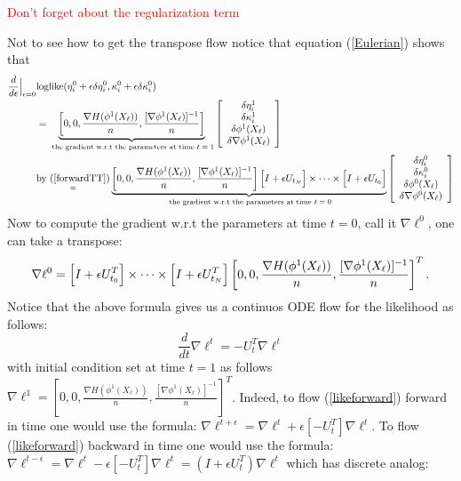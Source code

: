 \documentclass[noinfoline]{imsart}
\begin{document}
{\textcolor{red}{Don't forget about the regularization term}

Not to see how to get the transpose flow notice that equation (\ref{Eulerian}) shows that
\begin{align*}
\frac{d}{d\epsilon}\Bigr|_{\epsilon = 0}& \text{loglike}(\eta_i^0+\epsilon \delta \eta_i^0, \kappa^0_i+\epsilon \delta \kappa_i^0) \\
&=\underbrace{ \left[ 0,0,\frac{\nabla H (\phi^1(X_\ell))}{n}, \frac{[\nabla\phi^1(X_\ell)]^{-1}}{n}  \right]}_{\text{ the gradient w.r.t the parameters at time $t=1$}} \left[\begin{array}{c} \delta\eta^1_i\\ \delta \kappa^1_i \\ \delta\phi^1(X_\ell) \\ \delta \nabla\phi^1(X_\ell)   \end{array}\right] \\
&\underset{=}{ \text{by (\ref{forwardTT})}} \underbrace{ \left[ 0,0,\frac{\nabla H (\phi^1(X_\ell))}{n}, \frac{[\nabla\phi^1(X_\ell)]^{-1}}{n}  \right] \Bigl[I+\epsilon U_{t_N} \Bigr]\times \cdots \times  \Bigl[I+\epsilon U_{t_0} \Bigr] }_{\text{ the gradient w.r.t the parameters at time $t=0$}}  \left[\begin{array}{c} \delta\eta^0_i\\ \delta \kappa^0_i \\ \delta\phi^0(X_\ell) \\ \delta \nabla\phi^0(X_\ell)   \end{array}\right]
\end{align*}
Now to compute the gradient w.r.t the parameters at time $t=0$, call it $\nabla \ell^0$, one can take a transpose:
\begin{equation}
\label{oouoo}
\nabla \ell^0 =\Bigl[I+\epsilon U_{t_0}^T \Bigr]\times \cdots \times \Bigl[I+\epsilon U_{t_N}^T \Bigr] \left[ 0,0,\frac{\nabla H (\phi^1(X_\ell))}{n}, \frac{[\nabla\phi^1(X_\ell)]^{-1}}{n}  \right]^T.
\end{equation}
Notice that the above formula gives us a continuos ODE flow for the likelihood as follows:
\begin{equation}
\label{likeforward}
\frac{d}{dt} \nabla\ell^t = -U_t^T   \nabla\ell^t
\end{equation}
with initial condition set at time $t=1$ as follows $ \nabla\ell^1 = \left[ 0,0,\frac{\nabla H (\phi^1(X_\ell))}{n}, \frac{[\nabla\phi^1(X_\ell)]^{-1}}{n}  \right]^T$. Indeed, to flow (\ref{likeforward}) forward in time one would use the formula: $\nabla \ell^{t+\epsilon} = \nabla \ell^{t} + \epsilon  [-U_t^T]   \nabla\ell^t$. To flow  (\ref{likeforward}) backward in time one would use the formula: $\nabla \ell^{t-\epsilon} = \nabla \ell^{t} - \epsilon  [-U_t^T]   \nabla\ell^t = (I + \epsilon  U_t^T)  \nabla\ell^t$ which has discrete analog:
}
\end{document}
